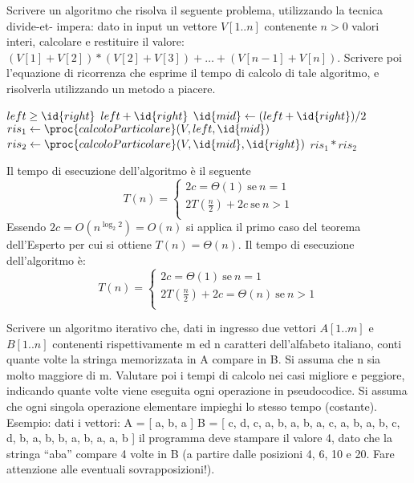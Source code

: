 Scrivere un algoritmo che risolva il seguente problema, utilizzando la tecnica divide-et-
impera: dato in input un vettore $V[1..n]$ contenente $n > 0$ valori interi, calcolare e restituire il
valore: $(V[1] + V[2]) * (V[2] + V[3]) + \dots + (V[n-1] + V[n])$.
Scrivere poi l’equazione di ricorrenza che esprime il tempo di calcolo di tale algoritmo, e
risolverla utilizzando un metodo a piacere.

\begin{codebox}
\li \If $left \geq \id{right}$
    \Then
\li              \Return $left + \id{right}$
    \End
\li $\id{mid} \gets (left + \id{right}) / 2$
\li $ris_1 \gets \proc{calcoloParticolare}(V,left,\id{mid})$
\li $ris_2 \gets \proc{calcoloParticolare}(V,\id{mid},\id{right})$
\li \Return $ris_1 * ris_2$
\end{codebox}

Il tempo di esecuzione dell'algoritmo è il seguente
\begin{equation*}
  T(n) = \begin{cases} 2c = \Theta(1) \ \text{se} \ n = 1 \\
                       2T(\frac{n}{2}) + 2c \ \text{se} \ n > 1\\
         \end{cases}
\end{equation*}
Essendo $2c = O(n^{\log _ 2 2}) = O(n)$ si applica il primo caso del teorema dell'Esperto
per cui si ottiene $T(n) = \Theta(n)$. Il tempo di esecuzione dell'algoritmo è:
\begin{equation*}
  T(n) = \begin{cases} 2c = \Theta(1) \ \text{se} \ n = 1 \\
                       2T(\frac{n}{2}) + 2c = \Theta(n) \ \text{se} \ n > 1\\
         \end{cases}
\end{equation*}


Scrivere un algoritmo iterativo che, dati in ingresso due vettori $A[1..m]$ e $B[1..n]$ contenenti
rispettivamente m ed n caratteri dell’alfabeto italiano, conti quante volte la stringa
memorizzata in A compare in B. Si assuma che n sia molto maggiore di m.
Valutare poi i tempi di calcolo nei casi migliore e peggiore, indicando quante volte viene
eseguita ogni operazione in pseudocodice. Si assuma che ogni singola operazione elementare
impieghi lo stesso tempo (costante).
Esempio: dati i vettori:
A = [ a, b, a ]
B = [ c, d, c, a, b, a, b, a, c, a, b, a, b, c, d, b, a, b, b, a, b, a, a, b ]
il programma deve stampare il valore 4, dato che la stringa “aba” compare 4 volte in B (a
partire dalle posizioni 4, 6, 10 e 20. Fare attenzione alle eventuali sovrapposizioni!).

